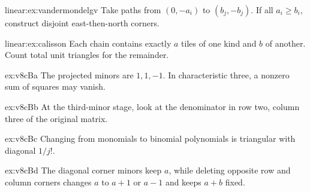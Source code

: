 \begin{hint}{linear:ex:vandermondelgv}
Take paths from $(0,-a_i)$ to $(b_j,-b_j)$. If all $a_i\ge b_i$, construct disjoint east-then-north corners.
\end{hint}
\begin{hint}{linear:ex:calisson}
Each chain contains exactly $a$ tiles of one kind and $b$ of another. Count total unit triangles for the remainder.
\end{hint}
\begin{hint}{ex:v8cBa}
The projected minors are $1,1,-1$. In characteristic three, a nonzero sum of squares may vanish.
\end{hint}
\begin{hint}{ex:v8cBb}
At the third-minor stage, look at the denominator in row two, column three of the original matrix.
\end{hint}
\begin{hint}{ex:v8cBc}
Changing from monomials to binomial polynomials is triangular with diagonal $1/j!$.
\end{hint}
\begin{hint}{ex:v8cBd}
The diagonal corner minors keep $a$, while deleting opposite row and column corners changes $a$ to $a+1$ or $a-1$ and keeps $a+b$ fixed.
\end{hint}

